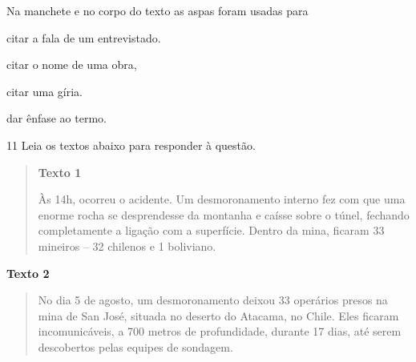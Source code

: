 
Na manchete e no corpo do texto as aspas foram usadas para

\begin{multicols}{2}
\begin{escolha}
    
    \item citar a fala de um entrevistado.
    
    \item citar o nome de uma obra,
    
    \item citar uma gíria.
    
    \item dar ênfase ao termo.

\end{escolha}
\end{multicols}

\num{11} Leia os textos abaixo para responder à questão. 

\begin{quote}

\textbf{Texto 1}

Às 14h, ocorreu o acidente. Um desmoronamento interno fez com que uma
enorme rocha se desprendesse da montanha e caísse sobre o túnel,
fechando completamente a ligação com a superfície. Dentro da mina,
ficaram 33 mineiros -- 32 chilenos e 1 boliviano.

\end{quote}


\textbf{Texto 2}

\begin{quote}

No dia 5 de agosto, um desmoronamento deixou 33 operários presos na mina
de San José, situada no deserto do Atacama, no Chile. Eles ficaram
incomunicáveis, a 700 metros de profundidade, durante 17 dias, até serem
descobertos pelas equipes de sondagem.

\end{quote}

